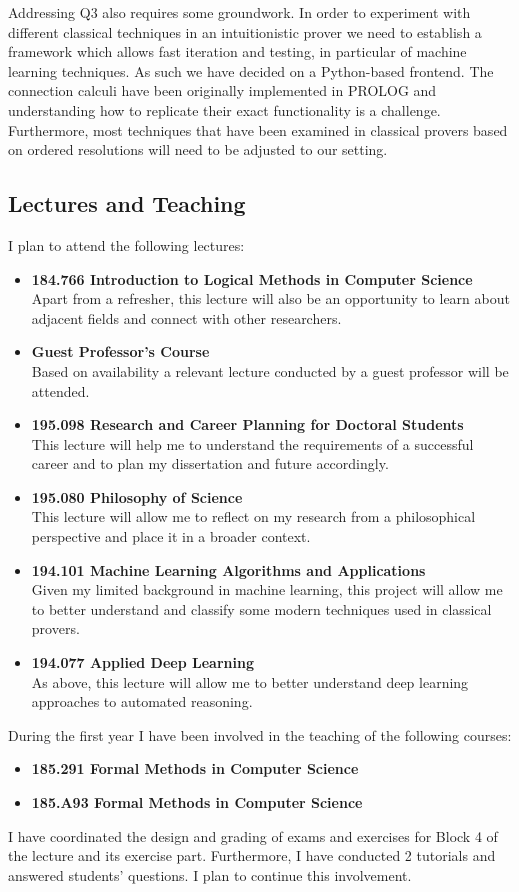 \documentclass{article}
\theoremstyle{definition}
\theoremstyle{definition}
\theoremstyle{definition}
\theoremstyle{definition}
\theoremstyle{definition}
\theoremstyle{definition}
\theoremstyle{definition}
\newcommand{\0}{\mathbf 0}
\newcommand{\1}{\mathbf 1}
\newcounter{question}
\begin{document}
	Addressing Q3 also requires some groundwork. In order to experiment with different classical techniques in an intuitionistic prover we need to establish a framework which allows fast iteration and testing, in particular of machine learning techniques. As such we have decided on a Python-based frontend. The connection calculi have been originally implemented in PROLOG and understanding how to replicate their exact functionality is a challenge. Furthermore, most techniques that have been examined in classical provers based on ordered resolutions will need to be adjusted to our setting.

	\subsection{Lectures and Teaching}

	I plan to attend the following lectures:

	\begin{itemize}
		\item\textbf{184.766 Introduction to Logical Methods in Computer Science}\\Apart from a refresher, this lecture will also be an opportunity to learn about adjacent fields and connect with other researchers.
		\item \textbf{Guest Professor’s Course}\\Based on availability a relevant lecture conducted by a guest professor will be attended.
		\item \textbf{195.098 Research and Career Planning for Doctoral Students}\\This lecture will help me to understand the requirements of a successful career and to plan my dissertation and future accordingly.
		\item \textbf{195.080 Philosophy of Science}\\This lecture will allow me to reflect on my research from a philosophical perspective and place it in a broader context.
		\item \textbf{194.101 Machine Learning Algorithms and Applications}\\Given my limited background in machine learning, this project will allow me to better understand and classify some modern techniques used in classical provers.
		\item \textbf{194.077 Applied Deep Learning}\\As above, this lecture will allow me to better understand deep learning approaches to automated reasoning.
	\end{itemize}
	During the first year I have been involved in the teaching of the following courses:
	\begin{itemize}
		\item \textbf{185.291 Formal Methods in Computer Science}
		\item \textbf{185.A93 Formal Methods in Computer Science}
	\end{itemize}
	I have coordinated the design and grading of exams and exercises for Block 4 of the lecture and its exercise part. Furthermore, I have conducted 2 tutorials and answered students' questions. I plan to continue this involvement.
\end{document}
